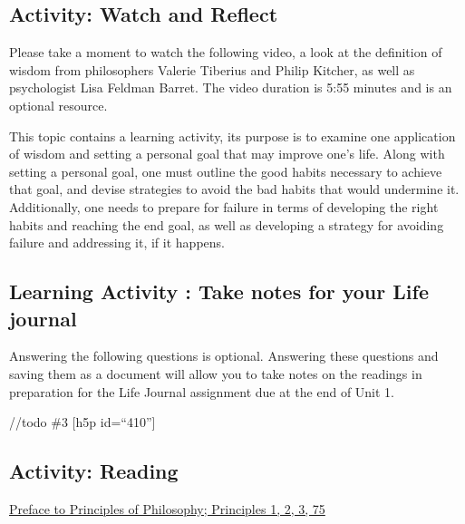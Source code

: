 \documentclass[
]{book}
\begin{document}
\hypertarget{activity-watch-and-reflect}{%
\subsection*{Activity: Watch and Reflect}\label{activity-watch-and-reflect}}

\begin{reflect}
Please take a moment to watch the following video, a look at the definition of wisdom from philosophers Valerie Tiberius and Philip Kitcher, as well as psychologist Lisa Feldman Barret. The video duration is 5:55 minutes and is an optional resource.
\end{reflect}

This topic contains a learning activity, its purpose is to examine one application of wisdom and setting a personal goal that may improve one's life. Along with setting a personal goal, one must outline the good habits necessary to achieve that goal, and devise strategies to avoid the bad habits that would undermine it. Additionally, one needs to prepare for failure in terms of developing the right habits and reaching the end goal, as well as developing a strategy for avoiding failure and addressing it, if it happens.

\hypertarget{learning-activity-take-notes-for-your-life-journal}{%
\subsection{Learning Activity : Take notes for your Life journal}\label{learning-activity-take-notes-for-your-life-journal}}

Answering the following questions is optional. Answering these questions and saving them as a document will allow you to take notes on the readings in preparation for the Life Journal assignment due at the end of Unit 1.

//todo \#3
{[}h5p id=``410''{]}

\hypertarget{activity-reading-1}{%
\subsection*{Activity: Reading}\label{activity-reading-1}}

\begin{reflect}
\href{assets/u1/PrinciplesofPhilosophy.pdf}{Preface to Principles of Philosophy; Principles 1, 2, 3, 75}
\end{reflect}
\end{document}
